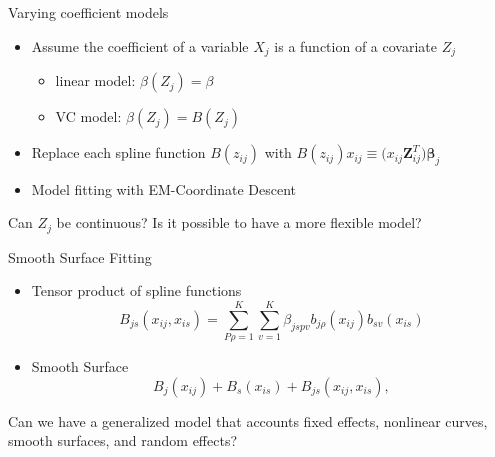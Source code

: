 \documentclass[
  ignorenonframetext,
  aspectratio=169]{beamer}
\providecommand{\tightlist}{%
  \setlength{\itemsep}{0pt}\setlength{\parskip}{0pt}}
\newcommand{\bs}[1]{\boldsymbol{#1}}
\begin{document}
\begin{frame}{Varying coefficient models}
\protect\hypertarget{varying-coefficient-models}{}
\begin{itemize}
\tightlist
\item
  Assume the coefficient of a variable \(X_j\) is a function of a
  covariate \(Z_j\)

  \begin{itemize}
  \tightlist
  \item
    linear model: \(\beta(Z_j) = \beta\)
  \item
    VC model: \(\beta(Z_j) = B(Z_j)\)
  \end{itemize}
\item
  Replace each spline function \(B(z_{ij})\) with
  \(B(z_{ij})x_{ij}\equiv \bs (x_{ij}\bs Z_{ij}^T)\bs \beta_j\)
\item
  Model fitting with EM-Coordinate Descent
\end{itemize}

\begin{tcolorbox}[colback=green!5,colframe=green!40!black,title=Question]
  Can $Z_j$ be continuous? Is it possible to have a more flexible model? 
\end{tcolorbox}
\end{frame}

\begin{frame}{Smooth Surface Fitting}
\protect\hypertarget{smooth-surface-fitting}{}
\begin{itemize}
\tightlist
\item
  Tensor product of spline functions \[
  B_{js}(x_{ij}, x_{is}) = \sum\limits^K_{P\rho=1} \sum\limits^K_{v=1} \beta_{jspv} b_{j\rho}(x_{ij})b_{sv}(x_{is})
  \]
\item
  Smooth Surface \[
    B_j(x_{ij}) + B_s(x_{is}) + B_{js}(x_{ij}, x_{is}),
  \]
\end{itemize}

\begin{tcolorbox}[colback=green!5,colframe=green!40!black,title=Question]
  Can we have a generalized model that accounts fixed effects, nonlinear curves, smooth surfaces, and random effects?
\end{tcolorbox}
\end{frame}
\end{document}
